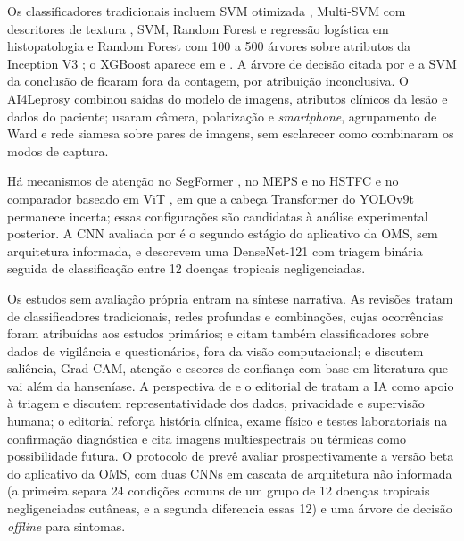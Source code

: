 Os classificadores tradicionais incluem SVM otimizada \cite{nyatte2022},
Multi-SVM com descritores de textura \cite{banerjee2023}, SVM, Random
Forest e regressão logística em histopatologia \cite{vargasclavijo2025} e
Random Forest com 100 a 500 árvores sobre atributos da Inception V3
\cite{lima2024skin}; o XGBoost aparece em  e
. A árvore de decisão citada por
 e a SVM da conclusão de 
ficaram fora da contagem, por atribuição inconclusiva. O AI4Leprosy
combinou saídas do modelo de imagens, atributos clínicos da lesão e dados
do paciente;  usaram câmera, polarização e
\textit{smartphone}, agrupamento de Ward e rede siamesa sobre pares de
imagens, sem esclarecer como combinaram os modos de captura.

Há mecanismos de atenção no SegFormer \cite{sanchez2024}, no MEPS e no
HSTFC \cite{mehta2026} e no comparador baseado em ViT \cite{eita2025}, em
que a cabeça Transformer do YOLOv9t permanece incerta; essas
configurações são candidatas à análise experimental posterior. A CNN
avaliada por  é o segundo estágio do aplicativo da
OMS, sem arquitetura informada, e  descrevem uma
DenseNet-121 com triagem binária seguida de classificação entre 12 doenças
tropicais negligenciadas.

Os estudos sem avaliação própria entram na síntese narrativa. As
revisões \cite{fernandes2024,andrade2025,goswami2026,ahikpa2025} tratam de
classificadores tradicionais, redes profundas e combinações, cujas
ocorrências foram atribuídas aos estudos primários;
 e  citam também
classificadores sobre dados de vigilância e questionários, fora da visão
computacional; e  discutem saliência, Grad-CAM,
atenção e escores de confiança com base em literatura que vai além da
hanseníase. A perspectiva de  e o editorial de
 tratam a IA como apoio à triagem e discutem
representatividade dos dados, privacidade e supervisão humana; o editorial
reforça história clínica, exame físico e testes laboratoriais na
confirmação diagnóstica e cita imagens multiespectrais ou térmicas como
possibilidade futura. O protocolo de  prevê avaliar
prospectivamente a versão beta do aplicativo da OMS, com duas CNNs em
cascata de arquitetura não informada (a primeira separa 24 condições
comuns de um grupo de 12 doenças tropicais negligenciadas cutâneas, e a
segunda diferencia essas 12) e uma árvore de decisão \textit{offline} para
sintomas.

